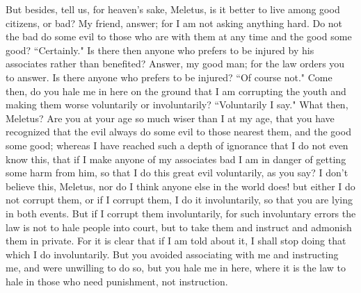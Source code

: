 \documentclass[letterpaper,12pt]{article}
\newcommand{\stephpag}[1]{\marginnote{\small\itshape\fontfamily{ppl}\selectfont #1}}
\begin{document}
But besides, tell us, for heaven's sake, Meletus, is it better to live among good citizens, or bad? My friend, answer; for I am not asking anything hard. Do not the bad do some evil to those who are with them at any time and the good some good? ``Certainly." Is there then anyone who \stephpag{d} prefers to be injured by his associates rather than benefited? Answer, my good man; for the law orders you to answer. Is there anyone who prefers to be injured? ``Of course not." Come then, do you hale me in here on the ground that I am corrupting the youth and making them worse voluntarily or involuntarily? ``Voluntarily I say." What then, Meletus? Are you at your age so much wiser than I at my age, that you have recognized that the evil always do some evil \stephpag{e} to those nearest them, and the good some good; whereas I have reached such a depth of ignorance that I do not even know this, that if I make anyone of my associates bad I am in danger of getting some harm from him, so that I do this great evil voluntarily, as you say? I don't believe this, Meletus, nor do I think anyone else in the world does! \stephpag{26 a} but either I do not corrupt them, or if I corrupt them, I do it involuntarily, so that you are lying in both events. But if I corrupt them involuntarily, for such involuntary errors the law is not to hale people into court, but to take them and instruct and admonish them in private. For it is clear that if I am told about it, I shall stop doing that which I do involuntarily. But you avoided associating with me and instructing me, and were unwilling to do so, but you hale me in here, where it is the law to hale in those who need punishment, not instruction.
\end{document}
